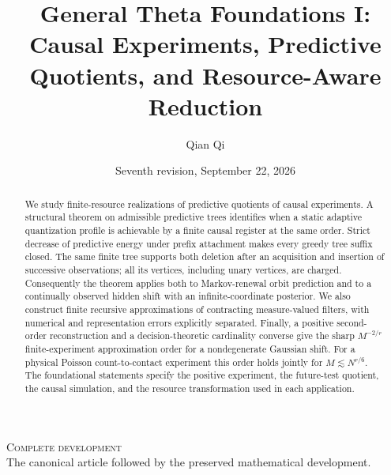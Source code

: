 
\newcommand{\Wone}{W_1}
\newcommand{\Del}{\Delta}
\newcommand{\emptyw}{\varnothing}
\newcommand{\osc}{\operatorname{osc}}
\newcommand{\diam}{\operatorname{diam}}
\newcommand{\Lipone}{\operatorname{Lip}_1}
\title[General Theta Foundations I]{General Theta Foundations I: Causal Experiments, Predictive Quotients, and Resource-Aware Reduction}
\author{Qian Qi}
\date{Seventh revision, September 22, 2026}

\begin{abstract}
We study finite-resource realizations of predictive quotients of causal
experiments. A structural theorem on admissible predictive trees identifies
when a static adaptive quantization profile is achievable by a finite
causal register at the same order. Strict decrease of predictive energy
under prefix attachment makes every greedy tree suffix closed. The same
finite tree supports both deletion after an acquisition and insertion of
successive observations; all its vertices, including unary vertices, are
charged. Consequently the theorem applies both to Markov-renewal orbit
prediction and to a continually observed hidden shift with an
infinite-coordinate posterior. We also construct finite recursive
approximations of contracting measure-valued filters, with numerical and
representation errors explicitly separated. Finally, a positive
second-order reconstruction and a decision-theoretic cardinality converse
give the sharp $M^{-2/r}$ finite-experiment approximation order for a
nondegenerate Gaussian shift. For a physical Poisson count-to-contact
experiment this order holds jointly for $M\lesssim N^{r/6}$. The
foundational statements specify the positive experiment, the future-test
quotient, the causal simulation, and the resource transformation used in
each application.
\end{abstract}
\maketitle
\ifcomplete
\begin{center}\small\textsc{Complete development}\\
The canonical article followed by the preserved mathematical development.\end{center}
\fi
\tableofcontents
